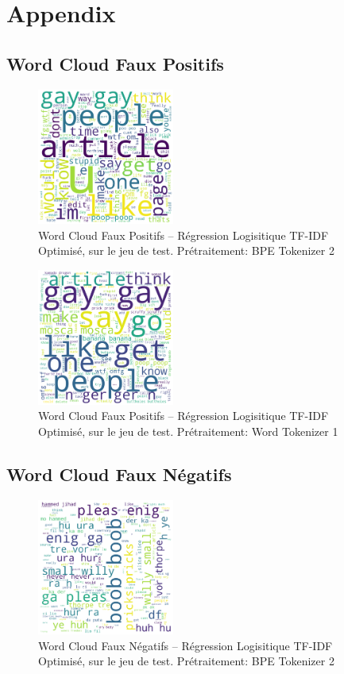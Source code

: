 \chapter{Appendix}
\label{chap:appendix_reg}

\section{Word Cloud Faux Positifs}
\begin{figure}[h]
    \centering
    \includegraphics[width=0.4\textwidth]{figures/word-cloud-reg-tf-fp.png}
    \caption{Word Cloud Faux Positifs – Régression Logisitique TF-IDF Optimisé, sur le jeu de test. Prétraitement: BPE Tokenizer 2}
\end{figure}

\begin{figure}[h]
    \centering
    \includegraphics[width=0.4\textwidth]{figures/word-cloud-reg-w2v-fp.png}
    \caption{Word Cloud Faux Positifs – Régression Logisitique TF-IDF Optimisé, sur le jeu de test. Prétraitement: Word Tokenizer 1}
\end{figure}

\newpage
\section{Word Cloud Faux Négatifs}
\begin{figure}[h]
    \centering
    \includegraphics[width=0.4\textwidth]{figures/word-cloud-reg-tf-fn.png}
    \caption{Word Cloud Faux Négatifs – Régression Logisitique TF-IDF Optimisé, sur le jeu de test. Prétraitement: BPE Tokenizer 2}
\end{figure}


